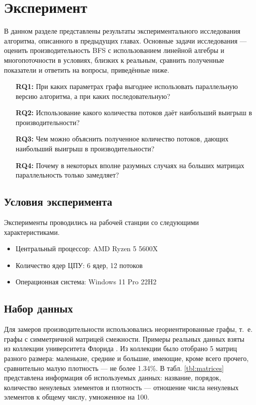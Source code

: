 
\section{Эксперимент}

В данном разделе представлены результаты экспериментального исследования алгоритма, описанного в предыдущих главах. Основные задачи исследования --- оценить производительность BFS с использованием линейной алгебры и многопоточности в условиях, близких к реальным, сравнить полученные показатели и ответить на вопросы, приведённые ниже.

\begin{itemize}
    \item[\textbf{RQ1:}] При каких параметрах графа выгоднее использовать параллельную версию алгоритма, а при каких последовательную?
    \item[\textbf{RQ2:}] Использование какого количества потоков даёт наибольший выигрыш в производительности?
    \item[\textbf{RQ3:}] Чем можно объяснить полученное количество потоков, дающих наибольший выигрыш в производительности?
    \item[\textbf{RQ4:}] Почему в некоторых вполне разумных случаях на больших матрицах параллельность только замедляет?
\end{itemize}

\subsection{Условия эксперимента}

Эксперименты проводились на рабочей станции со следующими характеристиками.
\begin{itemize}
    \item Центральный процессор: AMD Ryzen 5 5600X 
    \item Количество ядер ЦПУ: 6 ядер, 12 потоков 
    \item Операционная система: Windows 11 Pro 22H2
\end{itemize}

\subsection{Набор данных}

Для замеров производительности использовались неориентированные графы, т.~е. графы с симметричной матрицей смежности. Примеры реальных данных взяты из коллекции университета Флорида \cite{10.1145/2049662.2049663}. Из коллекции было отобрано 5 матриц разного размера: маленькие, средние и большие, имеющие, кроме всего прочего, сравнительно малую плотность --- не более 1.34\%. В табл. \ref{tbl:matrices} представлена информация об используемых данных: название, порядок, количество ненулевых элементов и плотность --- отношение числа ненулевых элементов к общему числу, умноженное на 100.

